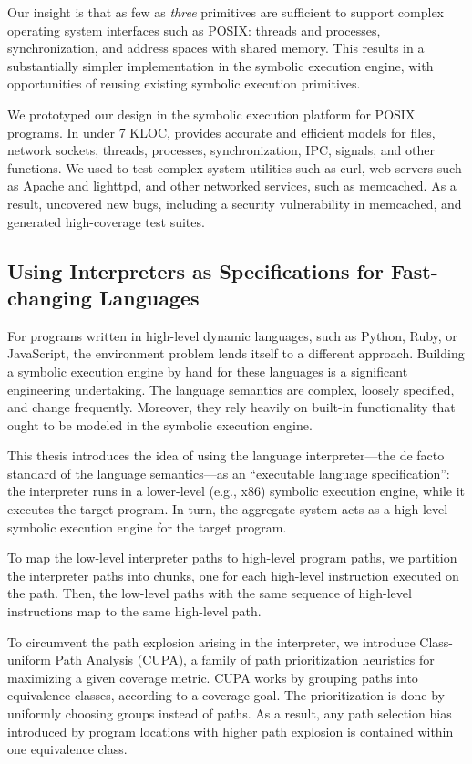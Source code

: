 Our insight is that as few as \emph{three} primitives are sufficient to support complex operating system interfaces such as POSIX: threads and processes, synchronization, and address spaces with shared memory.
%
This results in a substantially simpler implementation in the symbolic execution engine, with opportunities of reusing existing symbolic execution primitives.

We prototyped our design in the \emph{\cnine} symbolic execution platform for POSIX programs.  In under 7 KLOC, \cnine provides accurate and efficient models for files, network sockets, threads, processes, synchronization, IPC, signals, and other functions.
%
We used \cnine to test complex system utilities such as \textsf{curl}, web servers such as Apache and lighttpd, and other networked services, such as memcached.
%
As a result, \cnine uncovered new bugs, including a security vulnerability in memcached, and generated high-coverage test suites.


\subsection{Using Interpreters as Specifications for Fast-changing Languages}

For programs written in high-level dynamic languages, such as Python, Ruby, or JavaScript, the environment problem lends itself to a different approach.
%
Building a symbolic execution engine by hand for these languages is a significant engineering undertaking.  The language semantics are complex, loosely specified, and change frequently.  Moreover, they rely heavily on built-in functionality that ought to be modeled in the symbolic execution engine.

This thesis introduces the idea of using the language interpreter---the de facto standard of the language semantics---as an ``executable language specification'': the interpreter runs in a lower-level (e.g., x86) symbolic execution engine, while it executes the target program.  In turn, the aggregate system acts as a high-level symbolic execution engine for the target program.

To map the low-level interpreter paths to high-level program paths, we partition the interpreter paths into chunks, one for each high-level instruction executed on the path. Then, the low-level paths with the same sequence of high-level instructions map to the same high-level path.

To circumvent the path explosion arising in the interpreter, we introduce Class-uniform Path Analysis (CUPA), a family of path prioritization heuristics for maximizing a given coverage metric.
%
CUPA works by grouping paths into equivalence classes, according to a coverage goal.  The prioritization is done by uniformly choosing groups instead of paths.  As a result, any path selection bias introduced by program locations with higher path explosion is contained within one equivalence class.

